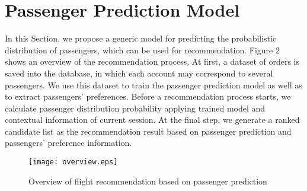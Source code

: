 \documentclass{llncs}
\begin{document}
\section{Passenger Prediction Model}
\label{sec:mod}
In this Section, we propose a generic model for predicting the probabilistic distribution of passengers, which can be used for recommendation.  Figure 2 shows an overview of the recommendation process. At first, a dataset of orders is saved into the database, in which each account may correspond to several passengers. We use this dataset to train the passenger prediction model as well as to extract passengers' preferences. Before a recommendation process starts, we calculate passenger distribution probability applying trained model and contextual information of current session. At the final step, we generate a ranked candidate list as the recommendation result based on passenger prediction and passengers' preference information.\par
\begin{figure}[!hbt]
\centering
\texttt{[image: overview.eps]}
\caption{Overview of flight recommendation based on passenger prediction}
\label{fig:over}
\end{figure}\par
\end{document}
